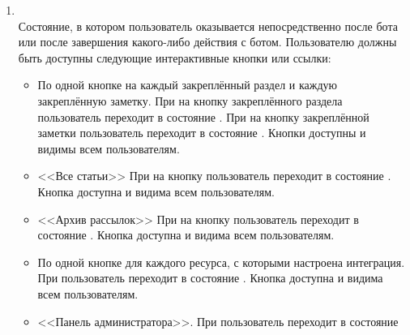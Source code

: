 \begin{enumerate}
        \item \label{itm:req:ui:states:mainmenu}
             \\
            Состояние, в котором пользователь оказывается непосредственно после 
            бота или после завершения какого-либо действия с ботом. Пользователю должны быть доступны
            следующие интерактивные кнопки или ссылки:
            \begin{itemize}
                \item
                    По одной кнопке на каждый закреплённый раздел и каждую закреплённую заметку.
                    При  на кнопку закреплённого раздела пользователь переходит
                    в состояние
                    \hyperref[itm:req:ui:states:navx]
                    {}.
                    При  на кнопку закреплённой заметки пользователь переходит
                    в состояние
                    \hyperref[itm:req:ui:states:view-note]
                    {}.
                    Кнопки доступны и видимы всем пользователям.
                \item
                    <<Все статьи>>
                    При  на кнопку пользователь переходит в состояние
                    \hyperref[itm:req:ui:states:navx]
                    {}.
                    Кнопка доступна и видима всем пользователям.
                \item
                    <<Архив рассылок>>
                    При  на кнопку пользователь переходит в состояние
                    \hyperref[itm:req:ui:states:navx]
                    {}.
                    Кнопка доступна и видима всем пользователям.
                \item
                    По одной кнопке для каждого ресурса, с которыми настроена интеграция.
                    При  пользователь переходит в состояние
                    \hyperref[itm:req:ui:states:integrationx]
                    {}.
                    Кнопка доступна и видима всем пользователям.
                \item
                    <<Панель администратора>>.
                    При  пользователь переходит в состояние

\end{itemize}
\end{enumerate}
